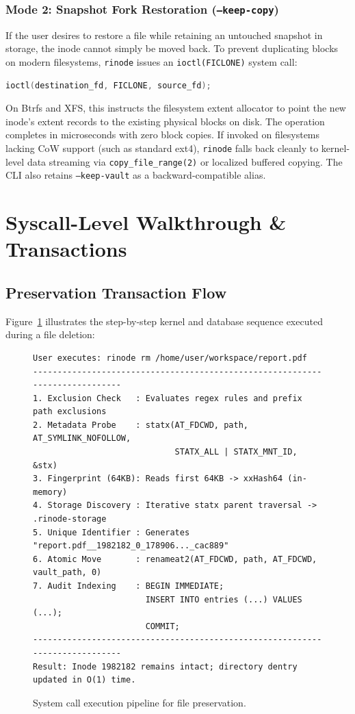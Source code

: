 \documentclass[11pt,a4paper]{article}
\begin{document}
\subsubsection{Mode 2: Snapshot Fork Restoration (\texttt{--keep-copy})}
If the user desires to restore a file while retaining an untouched snapshot in storage, the inode cannot simply be moved back. To prevent duplicating blocks on modern filesystems, \texttt{rinode} issues an \texttt{ioctl(FICLONE)} system call:
\begin{lstlisting}[language=C]
ioctl(destination_fd, FICLONE, source_fd);
\end{lstlisting}
On Btrfs and XFS, this instructs the filesystem extent allocator to point the new inode's extent records to the existing physical blocks on disk. The operation completes in microseconds with zero block copies. If invoked on filesystems lacking CoW support (such as standard ext4), \texttt{rinode} falls back cleanly to kernel-level data streaming via \texttt{copy\_file\_range(2)} or localized buffered copying. The CLI also retains \texttt{--keep-vault} as a backward-compatible alias.

\section{Syscall-Level Walkthrough \& Transactions}

\subsection{Preservation Transaction Flow}
Figure~\ref{fig:txn_flow} illustrates the step-by-step kernel and database sequence executed during a file deletion:

\begin{figure}[h]
\centering
\begin{verbatim}
User executes: rinode rm /home/user/workspace/report.pdf
-----------------------------------------------------------------------------
1. Exclusion Check   : Evaluates regex rules and prefix path exclusions
2. Metadata Probe    : statx(AT_FDCWD, path, AT_SYMLINK_NOFOLLOW, 
                             STATX_ALL | STATX_MNT_ID, &stx)
3. Fingerprint (64KB): Reads first 64KB -> xxHash64 (in-memory)
4. Storage Discovery : Iterative statx parent traversal -> .rinode-storage
5. Unique Identifier : Generates "report.pdf__1982182_0_178906..._cac889"
6. Atomic Move       : renameat2(AT_FDCWD, path, AT_FDCWD, vault_path, 0)
7. Audit Indexing    : BEGIN IMMEDIATE;
                       INSERT INTO entries (...) VALUES (...);
                       COMMIT;
-----------------------------------------------------------------------------
Result: Inode 1982182 remains intact; directory dentry updated in O(1) time.
\end{verbatim}
\caption{System call execution pipeline for file preservation.}
\label{fig:txn_flow}
\end{figure}
\end{document}
